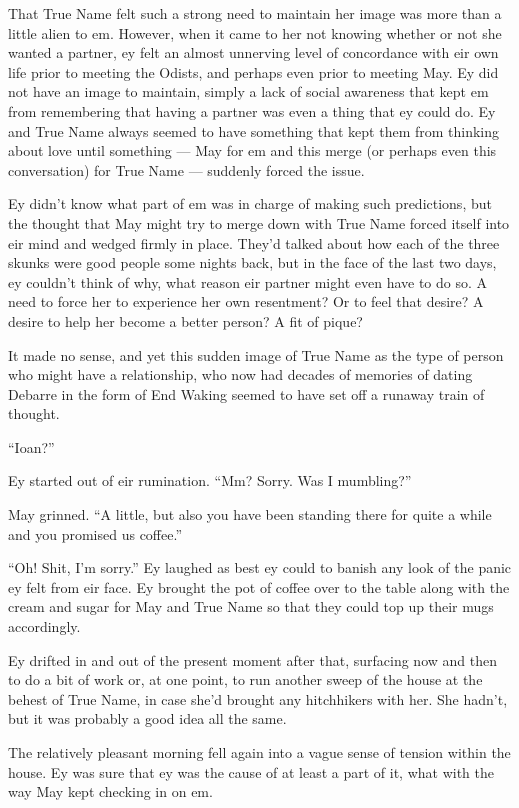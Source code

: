 That True Name felt such a strong need to maintain her image was more than a little alien to em. However, when it came to her not knowing whether or not she wanted a partner, ey felt an almost unnerving level of concordance with eir own life prior to meeting the Odists, and perhaps even prior to meeting May. Ey did not have an image to maintain, simply a lack of social awareness that kept em from remembering that having a partner was even a thing that ey could do. Ey and True Name always seemed to have something that kept them from thinking about love until something — May for em and this merge (or perhaps even this conversation) for True Name — suddenly forced the issue.

Ey didn't know what part of em was in charge of making such predictions, but the thought that May might try to merge down with True Name forced itself into eir mind and wedged firmly in place. They'd talked about how each of the three skunks were good people some nights back, but in the face of the last two days, ey couldn't think of why, what reason eir partner might even have to do so. A need to force her to experience her own resentment? Or to feel that desire? A desire to help her become a better person? A fit of pique?

It made no sense, and yet this sudden image of True Name as the type of person who might have a relationship, who now had decades of memories of dating Debarre in the form of End Waking seemed to have set off a runaway train of thought.

``Ioan?''

Ey started out of eir rumination. ``Mm? Sorry. Was I mumbling?''

May grinned. ``A little, but also you have been standing there for quite a while and you promised us coffee.''

``Oh! Shit, I'm sorry.'' Ey laughed as best ey could to banish any look of the panic ey felt from eir face. Ey brought the pot of coffee over to the table along with the cream and sugar for May and True Name so that they could top up their mugs accordingly.

Ey drifted in and out of the present moment after that, surfacing now and then to do a bit of work or, at one point, to run another sweep of the house at the behest of True Name, in case she'd brought any hitchhikers with her. She hadn't, but it was probably a good idea all the same.

The relatively pleasant morning fell again into a vague sense of tension within the house. Ey was sure that ey was the cause of at least a part of it, what with the way May kept checking in on em.


